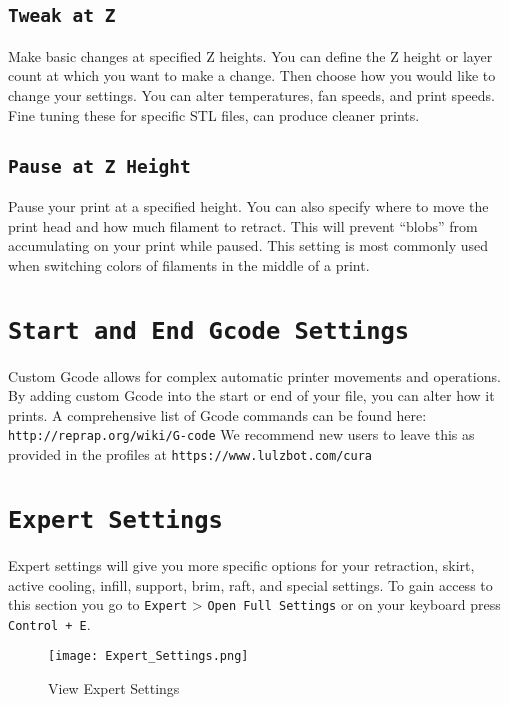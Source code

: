 \subsection{\texttt{Tweak at Z}}
Make basic changes at specified Z heights. You can define the Z height or layer count at which you want to make a change. Then choose how you would like to change your settings. You can alter temperatures, fan speeds, and print speeds. Fine tuning these for specific STL files, can produce cleaner prints.

\subsection{\texttt{Pause at Z Height}}
Pause your print at a specified height. You can also specify where to move the print head and how much filament to retract. This will prevent “blobs” from accumulating on your print while paused. This setting is most commonly used when switching colors of filaments in the middle of a print.

\section{\texttt{Start and End Gcode Settings}}
Custom Gcode allows for complex automatic printer movements and operations. By adding custom Gcode into the start or end of your file, you can alter how it prints. A comprehensive list of Gcode commands can be found here: \texttt{http://reprap.org/wiki/G-code} We recommend new users to leave this as provided in the profiles at \texttt{https://www.lulzbot.com/cura}


\section{\texttt{Expert Settings}}
Expert settings will give you more specific options for your retraction, skirt, active cooling, infill, support, brim, raft, and special settings. To gain access to this section you go to \texttt{Expert} > \texttt{Open Full Settings} or on your keyboard press \texttt{Control + E}.
\begin{figure}[H]
\centering
\texttt{[image: Expert\_Settings.png]}
\caption{View Expert Settings}
\label{fig:Expert Settings}
\end{figure}

